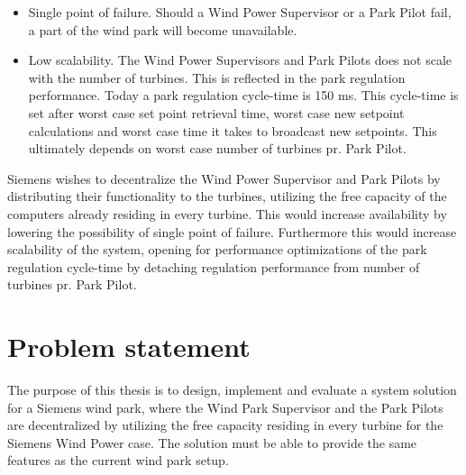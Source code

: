 \begin{itemize} 
	\item Single point of failure. Should a Wind Power Supervisor or a Park Pilot fail, a part of the wind park will become unavailable.
	\item Low scalability. The Wind Power Supervisors and Park Pilots does not scale with the number of turbines. This is reflected in the park regulation performance. Today a park regulation cycle-time is 150 ms. This cycle-time is set after worst case set point retrieval time, worst case new setpoint calculations and worst case time it takes to broadcast new setpoints. This ultimately depends on worst case number of turbines pr. Park Pilot.
\end{itemize}

Siemens wishes to decentralize the Wind Power Supervisor and Park Pilots by distributing their functionality to the turbines, utilizing the free capacity of the computers already residing in every turbine. This would increase availability by lowering the possibility of single point of failure. Furthermore this would increase scalability of the system, opening for performance optimizations of the park regulation cycle-time by detaching regulation performance from number of turbines pr. Park Pilot. 


\section{Problem statement}
\label{sec:problemStatement}

The purpose of this thesis is to design, implement and evaluate a system solution for a Siemens wind park, where the Wind Park Supervisor and the Park Pilots are decentralized by utilizing the free capacity residing in every turbine for the Siemens Wind Power case. The solution must be able to provide the same features as the current wind park setup. 


